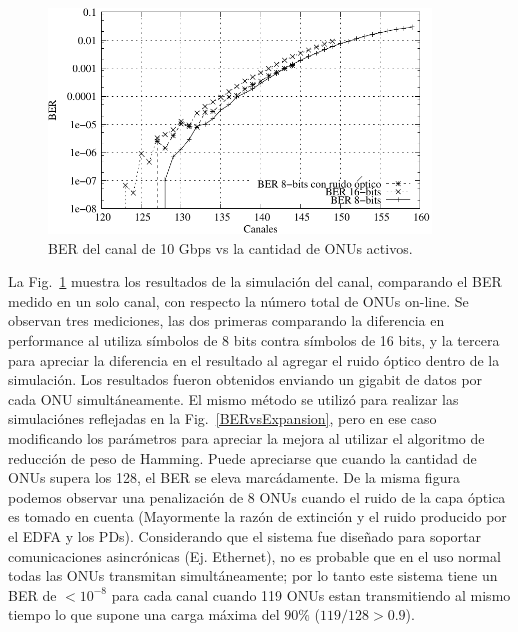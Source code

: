 
\begin{figure}[t]
  \centering
  \includegraphics[width=4in]{graphs/BER-tesis.pdf} 
  \caption{BER del canal de 10 Gbps vs la cantidad de ONUs activos.}
  \label{sim:access}
\end{figure}


La Fig.~\ref{sim:access} muestra los resultados de la simulación del canal, comparando el BER medido en un solo canal, con respecto la número total de ONUs on-line. Se observan tres mediciones, las dos primeras comparando la diferencia en performance al utiliza símbolos de 8 bits contra símbolos de 16 bits, y la tercera para apreciar la diferencia en el resultado al agregar el ruido óptico dentro de la simulación.
Los resultados fueron obtenidos enviando un gigabit de datos por cada ONU simultáneamente. El mismo método se utilizó para realizar las simulaciónes reflejadas en la Fig.~\ref{BERvsExpansion}, pero en ese caso modificando los parámetros para apreciar la mejora al utilizar el algoritmo de reducción de peso de Hamming.
Puede apreciarse que cuando la cantidad de ONUs supera los 128, el BER se eleva marcádamente.
De la misma figura podemos observar una penalización de $8$ ONUs cuando el ruido de la capa óptica es tomado en cuenta (Mayormente la razón de extinción y el ruido producido por el EDFA y los PDs).
Considerando que el sistema fue diseñado para soportar comunicaciones asincrónicas (Ej. Ethernet), no es probable que en el uso normal todas las ONUs transmitan simultáneamente; por lo tanto este sistema tiene un BER de $<10^{-8}$ para cada canal cuando 119 ONUs estan transmitiendo al mismo tiempo lo que supone una carga máxima del $90\%$ ($119/128>0.9$). 


